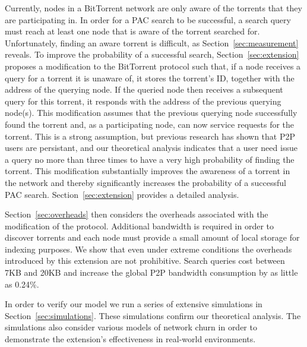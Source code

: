 Currently, nodes in a BitTorrent network are only aware of the torrents that they are participating in. In order for a PAC search to be successful, a search query must reach at least one node that is aware of the torrent searched for. Unfortunately, finding an aware torrent is difficult, as Section~\ref{sec:measurement} reveals. To improve the probability of a successful search, Section~\ref{sec:extension} proposes a modification to the BitTorrent protocol such that, if a node receives a query for a torrent it is unaware of, it stores the torrent's ID, together with the address of the querying node.  If the queried node then receives a subsequent query for this torrent, it responds with the address of the previous querying node(s). This modification assumes that the previous querying node successfully found the torrent and, as a participating node, can now service requests for the torrent. This is a strong assumption, but previous research \cite{Gummadi2003} has shown that P2P users are persistant, and our theoretical analysis indicates that a user need issue a query no more than three times to have a very high probability of finding the torrent. This modification substantially improves the awareness of a torrent in the network and thereby significantly increases the probability of a successful PAC search. Section~\ref{sec:extension} provides a detailed analysis.

Section~\ref{sec:overheads} then considers the overheads associated with the modification of the protocol. Additional bandwidth is required in order to discover torrents and each node must provide a small amount of local storage for indexing purposes. We show that even under extreme conditions the overheads introduced by this extension are not prohibitive. Search queries cost between 7KB and 20KB and increase the global P2P bandwidth consumption by as little as 0.24\%.

In order to verify our model we run a series of extensive simulations in Section~\ref{sec:simulations}. These simulations confirm our theoretical analysis. The simulations also consider various models of network churn in order to demonstrate the extension's effectiveness in real-world environments.
